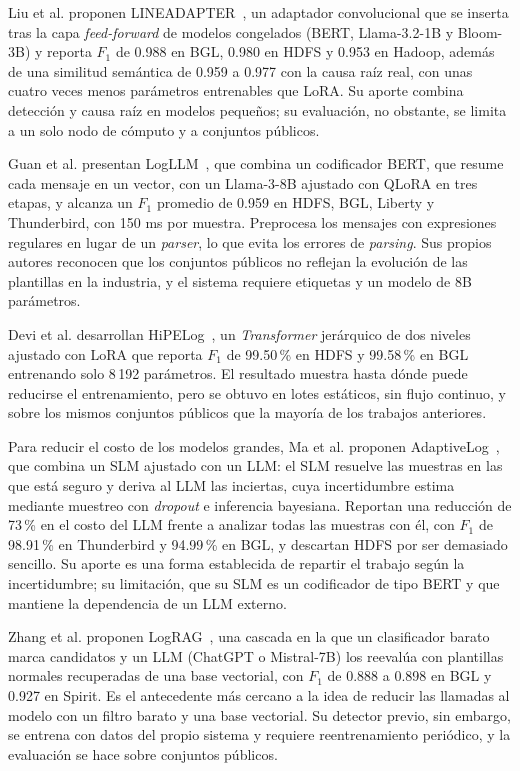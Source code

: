 Liu et al. proponen LINEADAPTER~\cite{liu2025_lineadapter}, un adaptador convolucional que se inserta tras la capa \textit{feed-forward} de modelos congelados (BERT, Llama-3.2-1B y Bloom-3B) y reporta $F_1$ de 0.988 en BGL, 0.980 en HDFS y 0.953 en Hadoop, además de una similitud semántica de 0.959 a 0.977 con la causa raíz real, con unas cuatro veces menos parámetros entrenables que LoRA. Su aporte combina detección y causa raíz en modelos pequeños; su evaluación, no obstante, se limita a un solo nodo de cómputo y a conjuntos públicos.

Guan et al. presentan LogLLM~\cite{guan2024_logllm}, que combina un codificador BERT, que resume cada mensaje en un vector, con un Llama-3-8B ajustado con QLoRA en tres etapas, y alcanza un $F_1$ promedio de 0.959 en HDFS, BGL, Liberty y Thunderbird, con 150 ms por muestra. Preprocesa los mensajes con expresiones regulares en lugar de un \textit{parser}, lo que evita los errores de \textit{parsing}. Sus propios autores reconocen que los conjuntos públicos no reflejan la evolución de las plantillas en la industria, y el sistema requiere etiquetas y un modelo de 8B parámetros.

Devi et al. desarrollan HiPELog~\cite{devi2026_hipelog}, un \textit{Transformer} jerárquico de dos niveles ajustado con LoRA que reporta $F_1$ de 99.50\,\% en HDFS y 99.58\,\% en BGL entrenando solo 8\,192 parámetros. El resultado muestra hasta dónde puede reducirse el entrenamiento, pero se obtuvo en lotes estáticos, sin flujo continuo, y sobre los mismos conjuntos públicos que la mayoría de los trabajos anteriores.

Para reducir el costo de los modelos grandes, Ma et al. proponen AdaptiveLog~\cite{ma2026_adaptivelog}, que combina un SLM ajustado con un LLM: el SLM resuelve las muestras en las que está seguro y deriva al LLM las inciertas, cuya incertidumbre estima mediante muestreo con \textit{dropout} e inferencia bayesiana. Reportan una reducción de 73\,\% en el costo del LLM frente a analizar todas las muestras con él, con $F_1$ de 98.91\,\% en Thunderbird y 94.99\,\% en BGL, y descartan HDFS por ser demasiado sencillo. Su aporte es una forma establecida de repartir el trabajo según la incertidumbre; su limitación, que su SLM es un codificador de tipo BERT y que mantiene la dependencia de un LLM externo.

Zhang et al. proponen LogRAG~\cite{zhang2024_lograg}, una cascada en la que un clasificador barato marca candidatos y un LLM (ChatGPT o Mistral-7B) los reevalúa con plantillas normales recuperadas de una base vectorial, con $F_1$ de 0.888 a 0.898 en BGL y 0.927 en Spirit. Es el antecedente más cercano a la idea de reducir las llamadas al modelo con un filtro barato y una base vectorial. Su detector previo, sin embargo, se entrena con datos del propio sistema y requiere reentrenamiento periódico, y la evaluación se hace sobre conjuntos públicos.

